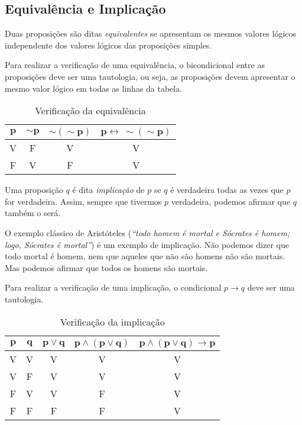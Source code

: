 \subsection*{Equivalência e Implicação}
Duas proposições são ditas \emph{equivalentes} se apresentam os mesmos valores lógicos independente dos valores lógicos das proposições simples.\par 
Para realizar a verificação de uma equivalência, o bicondicional entre as proposições deve ser uma tautologia, ou seja, as proposições devem apresentar o mesmo valor lógico em todas as linhas da tabela.
\begin{table}[H]
\centering
\caption[Equivalência]{Verificação da equivalência}
\begin{tabular}{c|c|c|c}
$\mathbf{p}$ & $\mathbf{\sim \! p}$ & $\mathbf{\sim \! ( \sim \! p)}$ & $\mathbf{p \leftrightarrow \ \sim \! ( \sim \! p)}$ \\ \hline
V & F & V & V \\
F & V & F & V                                        
\end{tabular}
\end{table}
Uma proposição $q$ é dita \emph{implicação} de $p$ se $q$ é verdadeira todas as vezes que $p$ for verdadeira. Assim, sempre que tivermos $p$ verdadeira, podemos afirmar que $q$ também o será.\par 
O exemplo clássico de Aristóteles (\textit{``todo homem é mortal e Sócrates é homem; logo, Sócrates é mortal''}) é um exemplo de implicação. Não podemos dizer que todo mortal é homem, nem que aqueles que não são homens não são mortais. Mas podemos afirmar que todos os homens são mortais. \par 
Para realizar a verificação de uma implicação, o condicional $p \rightarrow q$ deve ser uma tautologia.
\begin{table}[H]
\centering
\caption[Implicação]{Verificação da implicação}
\label{imply}
\begin{tabular}{c|c|c|c|c}
$\mathbf{p}$ & $\mathbf{q}$ & $\mathbf{p \vee q}$ & $\mathbf{p \wedge \left( p \vee q\right)}$ & $\mathbf{p \wedge \left( p \vee q\right) \rightarrow p}$ \\ \hline
V & V & V & V & V \\
V & F & V & V & V \\
F & V & V & F & V \\
F & F & F & F & V
\end{tabular}
\end{table}